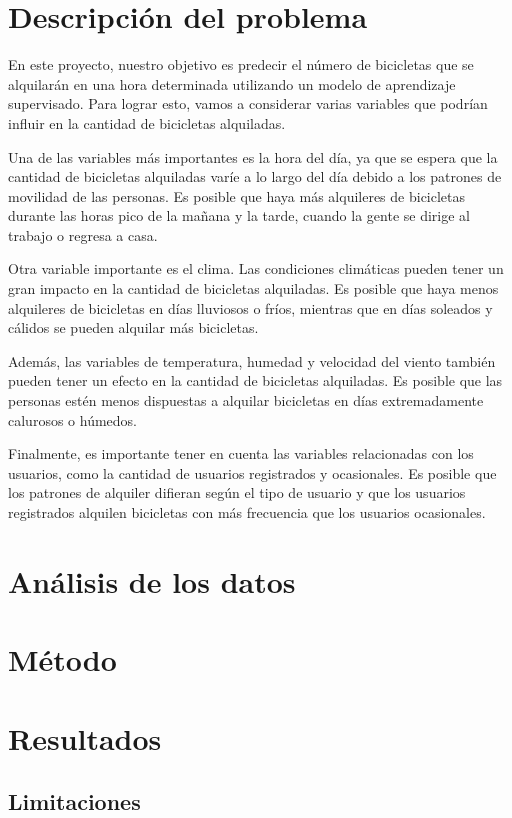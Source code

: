 \documentclass{wsdcr}
\begin{document}
\section{Descripción del problema}
En este proyecto, nuestro objetivo es predecir el número de bicicletas que se alquilarán en una hora determinada utilizando un modelo de aprendizaje supervisado. Para lograr esto, vamos a considerar varias variables que podrían influir en la cantidad de bicicletas alquiladas.

Una de las variables más importantes es la hora del día, ya que se espera que la cantidad de bicicletas alquiladas varíe a lo largo del día debido a los patrones de movilidad de las personas. Es posible que haya más alquileres de bicicletas durante las horas pico de la mañana y la tarde, cuando la gente se dirige al trabajo o regresa a casa.

Otra variable importante es el clima. Las condiciones climáticas pueden tener un gran impacto en la cantidad de bicicletas alquiladas. Es posible que haya menos alquileres de bicicletas en días lluviosos o fríos, mientras que en días soleados y cálidos se pueden alquilar más bicicletas.

Además, las variables de temperatura, humedad y velocidad del viento también pueden tener un efecto en la cantidad de bicicletas alquiladas. Es posible que las personas estén menos dispuestas a alquilar bicicletas en días extremadamente calurosos o húmedos.

Finalmente, es importante tener en cuenta las variables relacionadas con los usuarios, como la cantidad de usuarios registrados y ocasionales. Es posible que los patrones de alquiler difieran según el tipo de usuario y que los usuarios registrados alquilen bicicletas con más frecuencia que los usuarios ocasionales.

\section{Análisis de los datos}

\section{Método}

\section{Resultados}

\subsection{Limitaciones}
\end{document}
